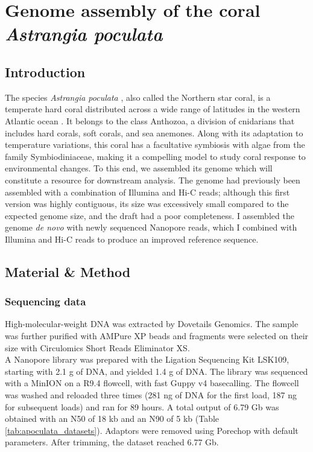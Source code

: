 
\chapter{Genome assembly of the coral \textit{Astrangia poculata}}

\section{Introduction}

The species \textit{Astrangia poculata} \cite{peters1988nomenclature}, also called the Northern star coral, is a temperate hard coral distributed across a wide range of latitudes in the western Atlantic ocean \cite{dimond2013simple}. It belongs to the class Anthozoa, a division of cnidarians that includes hard corals, soft corals, and sea anemones. Along with its adaptation to temperature variations, this coral has a facultative symbiosis with algae from the family Symbiodiniaceae, making it a compelling model to study coral response to environmental changes. To this end, we assembled its genome which will constitute a resource for downstream analysis. The genome had previously been assembled with a combination of Illumina and Hi-C reads; although this first version was highly contiguous, its size was excessively small compared to the expected genome size, and the draft had a poor completeness. I assembled the genome \textit{de novo} with newly sequenced Nanopore reads, which I combined with Illumina and Hi-C reads to produce an improved reference sequence. 

\section{Material \& Method}

\subsection{Sequencing data}

High-molecular-weight DNA was extracted by Dovetails Genomics. The sample was further purified with AMPure XP beads and fragments were selected on their size with Circulomics Short Reads Eliminator XS. \\
A Nanopore library was prepared with the Ligation Sequencing Kit LSK109, starting with 2.1 {\textmu}g of DNA, and yielded 1.4 {\textmu}g of DNA. The library was sequenced with a MinION on a R9.4 flowcell, with fast Guppy v4 basecalling. The flowcell was washed and reloaded three times (281 ng of DNA for the first load, 187 ng for subsequent loads) and ran for 89 hours. A total output of 6.79 Gb was obtained with an N50 of 18 kb and an N90 of 5 kb (Table \ref{tab:apoculata_datasets}). Adaptors were removed using Porechop \cite{porechop} with default parameters. After trimming, the dataset reached 6.77 Gb. \\

